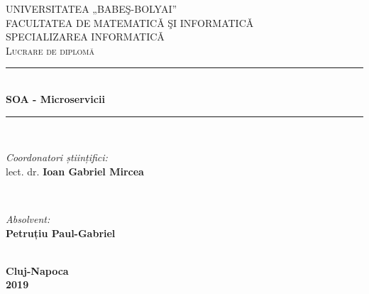 \documentclass[12pt]{report}
\begin{document}
\begin{titlepage}
 
\newcommand{\HRule}{\rule{\linewidth}{0.5mm}} %
 
\center %
 
 
\textsc{UNIVERSITATEA „BABEŞ-BOLYAI” \\
FACULTATEA DE MATEMATICǍ ŞI INFORMATICǍ \\
SPECIALIZAREA INFORMATICǍ}\\[5cm] %
\textsc{\large Lucrare de diplomă}\\[0.5cm] %
 
 
\HRule \\[0.4cm]
{\LARGE  \bfseries SOA - Microservicii}\\[0.4cm] %
\HRule \\[1.5cm]
 
 
\begin{minipage}{0.4\textwidth}
\begin{flushleft} \large
\emph{Coordonatori științifici:}\\
lect. dr. \textbf{Ioan Gabriel Mircea}
\end{flushleft}
\end{minipage}
~
\begin{minipage}{0.4\textwidth}
\begin{flushright} \large
\emph{Absolvent:} \\
\textbf{Petruțiu Paul-Gabriel} 
\end{flushright}
\end{minipage}\\[6cm]
 
 
{\large \textbf{Cluj-Napoca}}\\[2mm]
{\large \textbf{2019}} %
 
 
\vfill %
 
\end{titlepage}
\end{document}
